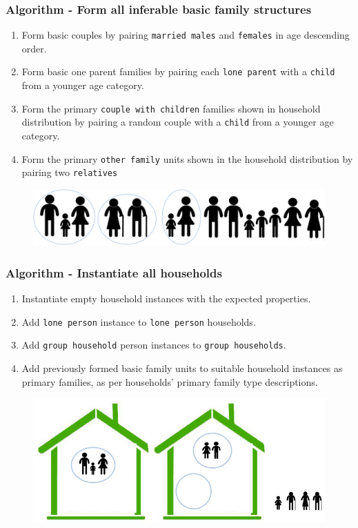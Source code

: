 \begin{frame}%
  \frametitle{Algorithm - Form all inferable basic family structures} %
  \begin{enumerate}%
  	\conti %
    \setlength\itemsep{1em}%
    \item Form basic couples by pairing \texttt{married
      males} and \texttt{females} in age descending order.%
    \item Form basic one parent families by pairing each \texttt{lone parent}
    with a \texttt{child} from a younger age category.%
    \item Form the primary \texttt{couple with children} families shown in
    household distribution by pairing a random couple with a \texttt{child} from
    a younger age category.%
    \item Form the primary \texttt{other family} units shown in the household
    distribution by pairing two \texttt{relatives}%
    \seti
  \end{enumerate}%
  \begin{figure}
\centering
\includegraphics[scale=0.3]{images/form-basic-family}
\end{figure}

\end{frame}%
      
\begin{frame}
  \frametitle{Algorithm - Instantiate all households}
  \begin{enumerate}
  	\conti
    \setlength\itemsep{1em}%
    \item Instantiate empty household instances with the expected properties.%
    \item Add \texttt{lone person} instance to \texttt{lone person} households.%
    \item Add \texttt{group household} person instances to \texttt{group 
    households}.%
    \item Add previously formed basic family units to suitable household 
    instances as primary families, as per households' primary family type 
    descriptions.%
    \seti
  \end{enumerate}%
  \begin{figure}
    \centering
    \includegraphics[scale=0.4]{images/form-hhs}
  \end{figure}
\end{frame}%

